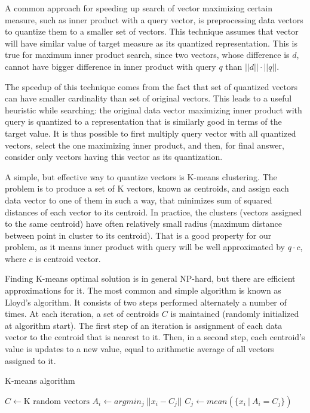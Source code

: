 A common approach for speeding up search of vector maximizing certain measure,
such as inner product with a query vector, is preprocessing data vectors to
quantize them to a smaller set of vectors. This technique assumes that vector
will have similar value of target measure as its quantized representation.
This is true for maximum inner product search, since two vectors,
whose difference is $d$, cannot have bigger difference in inner product with
query $q$ than $||d|| \cdot ||q||$.

The speedup of this technique comes from the fact that set of quantized vectors
can have smaller cardinality than set of original vectors. This leads to a 
useful heuristic while searching: the original data vector maximizing 
inner product with query is quantized to a representation that is similarly
good in terms of the target value. It is thus possible to first multiply 
query vector with all quantized vectors, select the one maximizing inner
product, and then, for final answer, consider only vectors having this vector
as its quantization.

A simple, but effective way to quantize vectors is K-means clustering.
The problem is to produce a set of K vectors, known as centroids, and assign 
each data vector to one of them in such a way, that minimizes sum of squared
distances of each vector to its centroid. In practice, the clusters (vectors
assigned to the same centroid) have often relatively small radius (maximum
distance between point in cluster to its centroid). That is a good property 
for our problem, as it means inner product with query will be well approximated
by $q \cdot c$, where $c$ is centroid vector.

Finding K-means optimal solution is in general NP-hard, but there are efficient
approximations for it. The most common and simple algorithm is known as 
Lloyd's algorithm. It consists of two steps performed alternately a number of
times. At each iteration, a set of centroids $C$ is maintained (randomly
initialized at algorithm start). The first
step of an iteration is assignment of each data vector to the centroid that
is nearest to it. Then, in a second step, each centroid's value is updates
to a new value, equal to arithmetic average of all vectors assigned to it.

\begin{algorithm}[H]
	\caption{K-means algorithm}
	\begin{algorithmic}
		\State $C \gets \text{K random vectors}$
		\Repeat
				\State $A_i \gets argmin_{j} \ || x_i - C_j || $
			\EndFor
				\State $C_j \gets mean(\{x_i\ |\ A_i = C_j\}) $
			\EndFor

		\State {}
	\end{algorithmic}
\end{algorithm}


